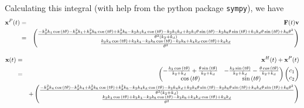 \documentclass{bmcart}
\begin{document}
Calculating this integral (with help from the python package
{\tt sympy}), we have
\begin{eqnarray*}
{\bf x}^P (t) & = & {\bf F} (t) {\bf v} \\
& = & \begin{pmatrix}\frac{- k_{2}^{2} k_{4} \cos{\left(t \theta \right)} - k_{2}^{2} k_{4} + k_{2}^{2} k_{6} \cos{\left(t \theta \right)} + k_{2}^{2} k_{6} - k_{2} k_{4} k_{d} \cos{\left(t \theta \right)} - k_{2} k_{4} k_{d} + k_{2} k_{4} \theta \sin{\left(t \theta \right)} - k_{2} k_{6} \theta \sin{\left(t \theta \right)} + k_{4} k_{d} \theta \sin{\left(t \theta \right)} + k_{6} \theta^{2}}{\theta^{2} \left(k_{2} + k_{d}\right)}\\\frac{k_{2} k_{4} \cos{\left(t \theta \right)} + k_{2} k_{4} - k_{2} k_{6} \cos{\left(t \theta \right)} - k_{2} k_{6} + k_{4} k_{d} \cos{\left(t \theta \right)} + k_{4} k_{d}}{\theta^{2}}\end{pmatrix}
\end{eqnarray*}

    \begin{eqnarray*}
{\bf x} (t) & = & {\bf x}^H (t) + {\bf x}^P (t) \\
& = & \begin{pmatrix}- \frac{k_{2} \cos{\left(t \theta \right)}}{k_{2} + k_{d}} + \frac{\theta \sin{\left(t \theta \right)}}{k_{2} + k_{d}} & - \frac{k_{2} \sin{\left(t \theta \right)}}{k_{2} + k_{d}} - \frac{\theta \cos{\left(t \theta \right)}}{k_{2} + k_{d}}\\\cos{\left(t \theta \right)} & \sin{\left(t \theta \right)}\end{pmatrix}  \begin{pmatrix} c_1 \\ c_2 \end{pmatrix} \\
&  & + \begin{pmatrix}\frac{- k_{2}^{2} k_{4} \cos{\left(t \theta \right)} - k_{2}^{2} k_{4} + k_{2}^{2} k_{6} \cos{\left(t \theta \right)} + k_{2}^{2} k_{6} - k_{2} k_{4} k_{d} \cos{\left(t \theta \right)} - k_{2} k_{4} k_{d} + k_{2} k_{4} \theta \sin{\left(t \theta \right)} - k_{2} k_{6} \theta \sin{\left(t \theta \right)} + k_{4} k_{d} \theta \sin{\left(t \theta \right)} + k_{6} \theta^{2}}{\theta^{2} \left(k_{2} + k_{d}\right)}\\\frac{k_{2} k_{4} \cos{\left(t \theta \right)} + k_{2} k_{4} - k_{2} k_{6} \cos{\left(t \theta \right)} - k_{2} k_{6} + k_{4} k_{d} \cos{\left(t \theta \right)} + k_{4} k_{d}}{\theta^{2}}\end{pmatrix}
\end{eqnarray*}
\end{document}
